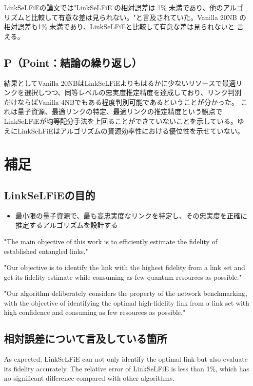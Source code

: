 \documentclass[conference]{IEEEtran}
\begin{document}
LinkSeLFiEの論文では"LinkSeLFiE の相対誤差は 1\% 未満であり、他のアルゴ
リズムと比較して有意な差は見られない。"と言及されていた。Vanilla 20NB
の相対誤差も1\% 未満であり、LinkSeLFiEと比較して有意な差は見られないと
言える。




\subsection{P（Point：結論の繰り返し）}
\label{sec:orgcb8c755}
結果としてVanilla 20NBはLinkSeLFiEよりもはるかに少ないリソースで最適リ
ンクを選択しつつ、同等レベルの忠実度推定精度を達成しており、リンク判別
だけならばVanilla 4NBでもある程度判別可能であるということが分かった。
これは量子資源、最適リンクの特定、最適リンクの推定精度という観点で
LinkSeLFiEが均等配分手法を上回ることができていないことを示している。ゆ
えにLinkSeLFiEはアルゴリズムの資源効率性における優位性を示せていない。


\section{補足}
\label{sec:org9e10be3}
\subsection{LinkSeLFiEの目的}
\label{sec:org6fed55d}
\begin{itemize}
\item 最小限の量子資源で、最も高忠実度なリンクを特定し、その忠実度を正確に推定するアルゴリズムを設計する
\end{itemize}

"The main objective of this work is to efficiently estimate the fidelity of established entangled links."

"Our objective is to identify the link with the highest fidelity from a
link set and get its fidelity estimate while consuming as few quantum
resources as possible."

"Our algorithm deliberately considers the property of the network
benchmarking, with the objective of identifying the optimal
high-fidelity link from a link set with high confidence and consuming
as few resources as possible."

\subsection{相対誤差について言及している箇所}
\label{sec:org4c622b2}
As expected, LinkSeLFiE can not only identify the optimal link but
also evaluate its fidelity accurately. The relative error of
LinkSeLFiE is less than 1\%, which has no significant difference
compared with other algorithms.
\end{document}
